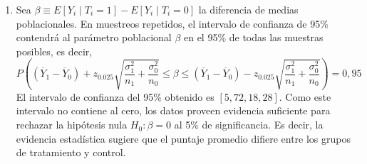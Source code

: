 \documentclass[10pt,a4paper]{article}
\begin{document}
\begin{enumerate}
{\begin{enumerate}
            \item Sea $\beta \equiv E[Y_i\mid T_i=1] - E[Y_i\mid T_i=0]$ la diferencia de medias poblacionales. En muestreos repetidos, el intervalo de confianza de 95\% contendrá al parámetro poblacional $\beta$ en el 95\% de todas las muestras posibles, es decir,
            $$
                P\left(
                    \left(
                        \overline Y_1
                        -
                        \overline Y_0
                    \right)
                    +
                    z_{0.025}
                    \sqrt{
                        \frac
                            {
                                \sigma_1^2
                            }
                            {
                                n_1
                            }
                        +
                        \frac
                            {
                                \sigma_0^2
                            }
                            {
                                n_0
                            }
                    }
                    \leq
                    \beta
                    \leq
                    \left(
                        \overline Y_1
                        -
                        \overline Y_0
                    \right)
                    -
                    z_{0.025}
                    \sqrt{
                        \frac
                            {
                                \sigma_1^2
                            }
                            {
                                n_1
                            }
                        +
                        \frac
                            {
                                \sigma_0^2
                            }
                            {
                                n_0
                            }
                    }
                \right)
                =
                0,95
            $$
            El intervalo de confianza del 95\% obtenido es $\left[5,72, 18,28 \right]$. Como este intervalo no contiene al cero, los datos proveen evidencia suficiente para rechazar la hipótesis nula $H_0\!\!: \beta = 0$ al 5\% de significancia. Es decir, la evidencia estadística sugiere que el puntaje promedio difiere entre los grupos de tratamiento y control.


\end{enumerate}}
\end{enumerate}
\end{document}
